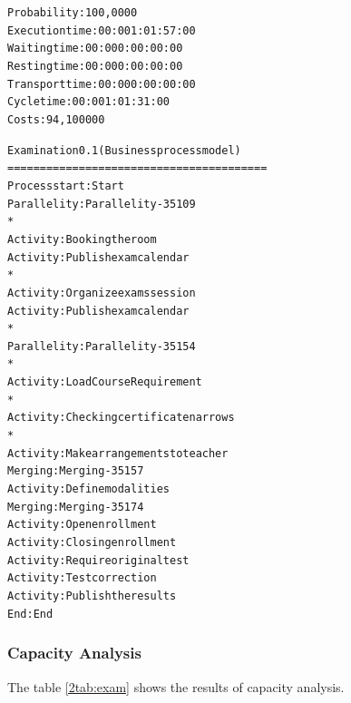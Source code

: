 \begin{alltt}
Probability:   100,0000%
Execution time:  00:001:01:57:00
Waiting time:  00:000:00:00:00
Resting time:  00:000:00:00:00
Transport time:  00:000:00:00:00
Cycle time:  00:001:01:31:00
Costs:  94,100000

Examination 0.1 (Business process model)
========================================
Process start: Start
Parallelity: Parallelity-35109
    *
    Activity: Booking the room
    Activity: Publish exam calendar
    *
    Activity: Organize exams session
    Activity: Publish exam calendar
    *
    Parallelity: Parallelity-35154
        *
        Activity: Load Course Requirement
        *
        Activity: Checking certificate narrows
        *
        Activity: Make arrangements to teacher
    Merging: Merging-35157
    Activity: Define modalities
Merging: Merging-35174
Activity: Open enrollment
Activity: Closing enrollment
Activity: Require original test
Activity: Test correction
Activity: Publish the results
End: End
\end{alltt}

\subsubsection{Capacity Analysis}
The table \ref{2tab:exam} shows the results of capacity analysis.

